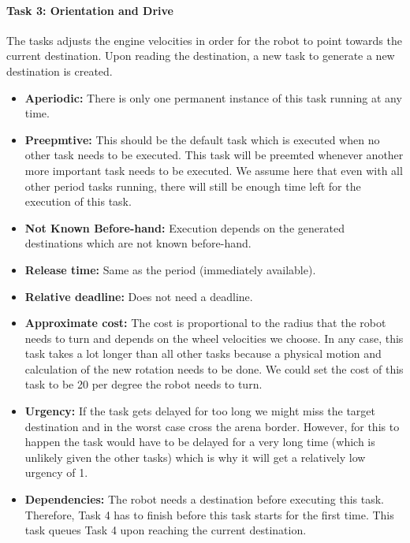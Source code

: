 \documentclass[12pt]{article}
\begin{document}
\paragraph{Task 3: Orientation and Drive}
The tasks adjusts the engine velocities in order for the robot to point towards the current destination. Upon reading the destination, a new task to generate a new destination is created.
  \begin{itemize}
  	\item \textbf{Aperiodic:} There is only one permanent instance of this task running at any time.
	\item \textbf{Preepmtive:} This should be the default task which is executed when no other task needs to be executed. This task will be preemted whenever another more important task needs to be executed. We assume here that even with all other period tasks running, there will still be enough time left for the execution of this task.
  	\item \textbf{Not Known Before-hand:} Execution depends on the generated destinations which are not known before-hand.
  	\item \textbf{Release time:} Same as the period (immediately available).
  	\item \textbf{Relative deadline:} Does not need a deadline.
  	\item \textbf{Approximate cost:} The cost is proportional to the radius that the robot needs to turn and depends on the wheel velocities we choose. In any case, this task takes a lot longer than all other tasks because a physical motion and calculation of the new rotation needs to be done. We could set the cost of this task to be 20 per degree the robot needs to turn.
  	\item \textbf{Urgency:} If the task gets delayed for too long we might miss the target destination and in the worst case cross the arena border. However, for this to happen the task would have to be delayed for a very long time (which is unlikely given the other tasks) which is why it will get a relatively low urgency of 1.
  	\item \textbf{Dependencies:} The robot needs a destination before executing this task. Therefore, Task 4 has to finish before this task starts for the first time. This task queues Task 4 upon reaching the current destination.
   	\end{itemize}
\end{document}
